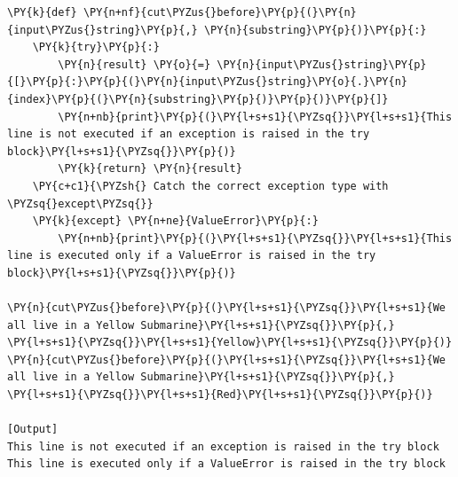 \begin{Verbatim}[label=\makebox{\url{https://github.com/lucabaldini/cmepda/tree/master/slides/latex/snippets/exceptions\_brief.py}},commandchars=\\\{\}]
\PY{k}{def} \PY{n+nf}{cut\PYZus{}before}\PY{p}{(}\PY{n}{input\PYZus{}string}\PY{p}{,} \PY{n}{substring}\PY{p}{)}\PY{p}{:}
    \PY{k}{try}\PY{p}{:}
        \PY{n}{result} \PY{o}{=} \PY{n}{input\PYZus{}string}\PY{p}{[}\PY{p}{:}\PY{p}{(}\PY{n}{input\PYZus{}string}\PY{o}{.}\PY{n}{index}\PY{p}{(}\PY{n}{substring}\PY{p}{)}\PY{p}{)}\PY{p}{]}
        \PY{n+nb}{print}\PY{p}{(}\PY{l+s+s1}{\PYZsq{}}\PY{l+s+s1}{This line is not executed if an exception is raised in the try block}\PY{l+s+s1}{\PYZsq{}}\PY{p}{)}
        \PY{k}{return} \PY{n}{result}
    \PY{c+c1}{\PYZsh{} Catch the correct exception type with \PYZsq{}except\PYZsq{}}
    \PY{k}{except} \PY{n+ne}{ValueError}\PY{p}{:}
        \PY{n+nb}{print}\PY{p}{(}\PY{l+s+s1}{\PYZsq{}}\PY{l+s+s1}{This line is executed only if a ValueError is raised in the try block}\PY{l+s+s1}{\PYZsq{}}\PY{p}{)}

\PY{n}{cut\PYZus{}before}\PY{p}{(}\PY{l+s+s1}{\PYZsq{}}\PY{l+s+s1}{We all live in a Yellow Submarine}\PY{l+s+s1}{\PYZsq{}}\PY{p}{,} \PY{l+s+s1}{\PYZsq{}}\PY{l+s+s1}{Yellow}\PY{l+s+s1}{\PYZsq{}}\PY{p}{)}
\PY{n}{cut\PYZus{}before}\PY{p}{(}\PY{l+s+s1}{\PYZsq{}}\PY{l+s+s1}{We all live in a Yellow Submarine}\PY{l+s+s1}{\PYZsq{}}\PY{p}{,} \PY{l+s+s1}{\PYZsq{}}\PY{l+s+s1}{Red}\PY{l+s+s1}{\PYZsq{}}\PY{p}{)}

[Output]
This line is not executed if an exception is raised in the try block
This line is executed only if a ValueError is raised in the try block
\end{Verbatim}